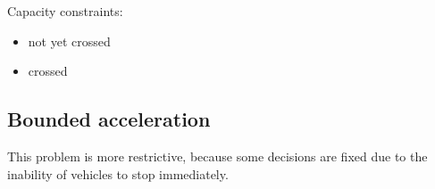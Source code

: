 \documentclass[a4paper]{article}
\theoremstyle{definition}
\theoremstyle{plain}
\begin{document}
\noindent
Capacity constraints:
\begin{itemize}
 \item not yet crossed
 \item crossed
\end{itemize}


\subsection*{Bounded acceleration}

This problem is more restrictive, because some decisions are fixed due to the
inability of vehicles to stop immediately.





\end{document}
